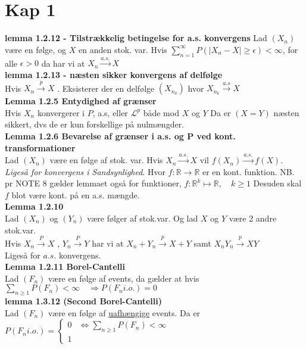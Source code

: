 \section*{Kap 1}
\textbf{lemma 1.2.12 - Tilstrækkelig betingelse for a.s. konvergens}\newline
Lad $(X_n)$ være en følge, og $X$ en anden stok. var. Hvis $\sum_{n=1}^\infty P(|X_n-X|\geq \epsilon) < \infty$, for alle $\epsilon>0$ da har vi  at $X_n \xrightarrow{a.s.} X$ \newline \\ 
\textbf{lemma 1.2.13 - næsten sikker konvergens af delfølge}\\
Hvis $X_n \xrightarrow{p} X$ . Eksisterer der en delfølge $ \left(X_{n_k}\right)$ hvor 
$X_{n_k} \xrightarrow{a.s} X $\newline \\
\textbf{Lemma 1.2.5 Entydighed af grænser}\\
Hvis $X_n$ konvergerer i $P$, a.s, eller $\mathcal{L}^p$ både mod $X$ og $Y$ Da er $\left(X=Y\right)$ næsten sikkert, dvs de er kun forskellige på nulmængder.\newline \\
\textbf{Lemma 1.2.6 Bevarelse af grænser i a.s. og P ved kont. transformationer}\\
Lad $(X_n)$ være en følge af stok. var. Hvis $X_n \xrightarrow{a.s.} X$ vil $f(X_n) \xrightarrow{a.s.} f(X)$. \textit{Ligeså for konvergens i Sandsynlighed}. Hvor $f:\mathbb{R} \to \mathbb{R}$ er en kont. funktion.
NB. pr NOTE 8 gælder lemmaet også for funktioner, $f:\mathbb{R}^k \mapsto \mathbb{R},\quad k\geq 1$ 
Desuden skal $f$ blot være kont. på en a.s. mængde.
\newline \\ 
\textbf{Lemma 1.2.10}\\
Lad $\left(X_n\right)$ og $\left(Y_n\right)$ være følger af stok.var. Og lad $X$ og $Y$ være 2 andre stok.var.\\
Hvis $X_n \xrightarrow{P} X$ , $Y_n \xrightarrow{P} Y$ har vi at $X_n + Y_n \xrightarrow{p} X+Y$ samt $X_nY_n \xrightarrow{p} XY$\\ 
Ligeså for $a.s.$ konvergens.\newline \\  
\textbf{Lemma 1.2.11 Borel-Cantelli}\\
Lad $\left(F_n\right)$ være en følge af events, da gælder at hvis $\sum_{n\geq1}P(F_n) < \infty\quad \Longrightarrow P(F_n i.o.)=0$\newline \\
\textbf{lemma 1.3.12 (Second Borel-Cantelli)}\\
Lad $\left(F_n\right)$ være en følge af \underline{uafhængige}  events. Da er $P(F_n i.o.) = \begin{cases} 0 & \Longleftrightarrow \sum_{n\geq 1}P(F_n) < \infty \\ 
1 \end{cases}$

